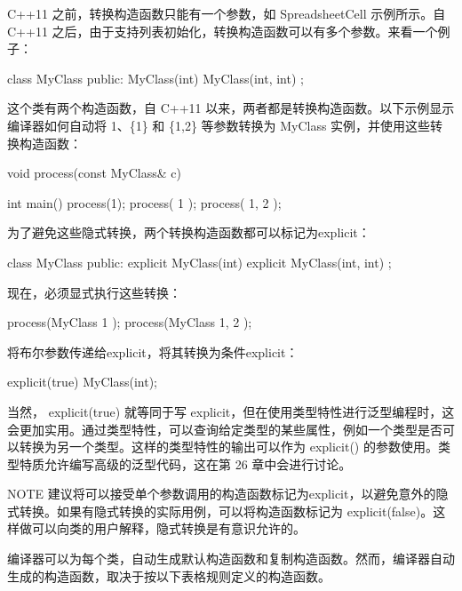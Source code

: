 C++11 之前，转换构造函数只能有一个参数，如 SpreadsheetCell 示例所示。自 C++11 之后，由于支持列表初始化，转换构造函数可以有多个参数。来看一个例子：

\begin{cpp}
class MyClass
{
    public:
        MyClass(int) { }
        MyClass(int, int) { }
};
\end{cpp}

这个类有两个构造函数，自 C++11 以来，两者都是转换构造函数。以下示例显示编译器如何自动将 1、\{1\} 和 \{1,2\} 等参数转换为 MyClass 实例，并使用这些转换构造函数：

\begin{cpp}
void process(const MyClass& c) { }

int main()
{
    process(1);
    process({ 1 });
    process({ 1, 2 });
}
\end{cpp}

为了避免这些隐式转换，两个转换构造函数都可以标记为explicit：

\begin{cpp}
class MyClass
{
    public:
    explicit MyClass(int) { }
    explicit MyClass(int, int) { }
};
\end{cpp}

现在，必须显式执行这些转换：

\begin{cpp}
process(MyClass{ 1 });
process(MyClass{ 1, 2 });
\end{cpp}

将布尔参数传递给explicit，将其转换为条件explicit：

\begin{cpp}
explicit(true) MyClass(int);
\end{cpp}

当然， explicit(true) 就等同于写 explicit，但在使用类型特性进行泛型编程时，这会更加实用。通过类型特性，可以查询给定类型的某些属性，例如一个类型是否可以转换为另一个类型。这样的类型特性的输出可以作为 explicit() 的参数使用。类型特质允许编写高级的泛型代码，这在第 26 章中会进行讨论。

\begin{myNotic}{NOTE}
建议将可以接受单个参数调用的构造函数标记为explicit，以避免意外的隐式转换。如果有隐式转换的实际用例，可以将构造函数标记为 explicit(false)。这样做可以向类的用户解释，隐式转换是有意识允许的。
\end{myNotic}


编译器可以为每个类，自动生成默认构造函数和复制构造函数。然而，编译器自动生成的构造函数，取决于按以下表格规则定义的构造函数。

